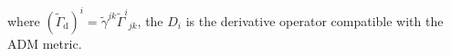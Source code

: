 %
where $(\widetilde{\Gamma}_{\text{d}})^i = \widetilde{\gamma}^{jk}{\widetilde{\Gamma}^i}_{jk}$, 
the $D_i$ is the derivative operator compatible with the \ac{ADM} metric.
%

%
%
%
%
%
%
%


